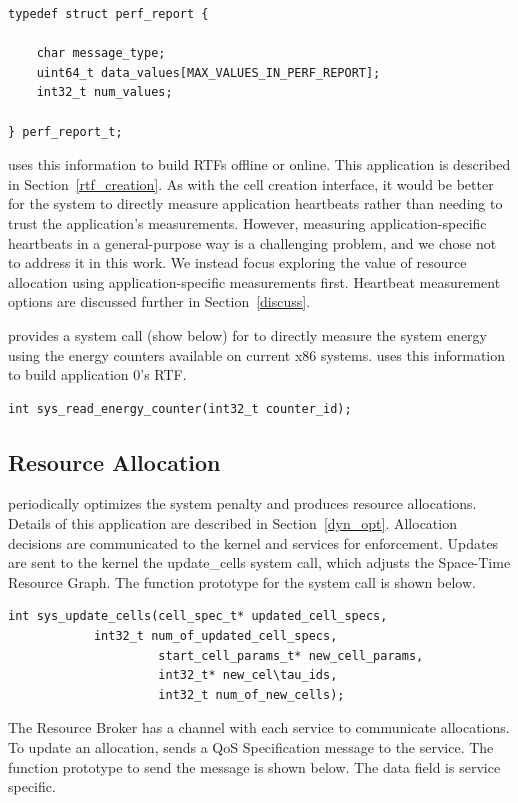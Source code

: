 \begin{lstlisting}
typedef struct perf_report {

    char message_type;
    uint64_t data_values[MAX_VALUES_IN_PERF_REPORT];
    int32_t num_values;
    
} perf_report_t;
\end{lstlisting}

\pacora uses this information to build RTFs offline or online.  This application is described in Section~\ref{rtf_creation}.  As with the cell creation interface, it would be better for the system to directly measure application heartbeats rather than needing to trust the application's measurements.  However, measuring application-specific heartbeats in a general-purpose way is a challenging problem, and we chose not to address it in this work.  We instead focus exploring the value of resource allocation using application-specific measurements first.  Heartbeat measurement options are discussed further in Section~\ref{discuss}.

\tess provides a system call (show below) for \pacora to directly measure the system energy using the energy counters available on current x86 systems.  \pacora uses this information to build application 0's RTF.

\begin{lstlisting}
int sys_read_energy_counter(int32_t counter_id);
\end{lstlisting}

\subsection{Resource Allocation}
\pacora periodically optimizes the system penalty and produces resource allocations.  Details of this application are described in Section~\ref{dyn_opt}.  Allocation decisions are communicated to the kernel and services for enforcement.  Updates are sent to the kernel the update\_cells system call, which adjusts the Space-Time Resource Graph.  The function prototype for the system call is shown below.

\begin{lstlisting}
int sys_update_cells(cell_spec_t* updated_cell_specs, 
		    int32_t num_of_updated_cell_specs,
                     start_cell_params_t* new_cell_params,
                     int32_t* new_cel\tau_ids,
                     int32_t num_of_new_cells);
\end{lstlisting}

The Resource Broker has a channel with each service to communicate allocations.  To update an allocation, \pacora sends a QoS Specification message to the service.  The function prototype to send the message is shown below.  The data field is service specific. 


